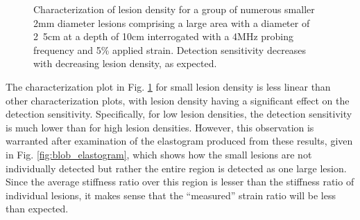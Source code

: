 			\begin{figure}[!t]
				\centering
				\caption[Lesion cluster density characterization]{Characterization of lesion density for a group of numerous smaller \unit{2}{mm} diameter lesions comprising a large area with a diameter of \unit{2.5}{cm} at a depth of \unit{10}{cm} interrogated with a \unit{4}{MHz} probing frequency and \unit{5}{\%} applied strain. Detection sensitivity decreases with decreasing lesion density, as expected.}
				\label{fig:blob_density_characterization}
			\end{figure}

			The characterization plot in Fig. \ref{fig:blob_density_characterization} for small lesion density is less linear than other characterization plots, with lesion density having a significant effect on the detection sensitivity. Specifically, for low lesion densities, the detection sensitivity is much lower than for high lesion densities. However, this observation is warranted after examination of the elastogram produced from these results, given in Fig. \ref{fig:blob_elastogram}, which shows how the small lesions are not individually detected but rather the entire region is detected as one large lesion. Since the average stiffness ratio over this region is lesser than the stiffness ratio of individual lesions, it makes sense that the ``measured'' strain ratio will be less than expected.

